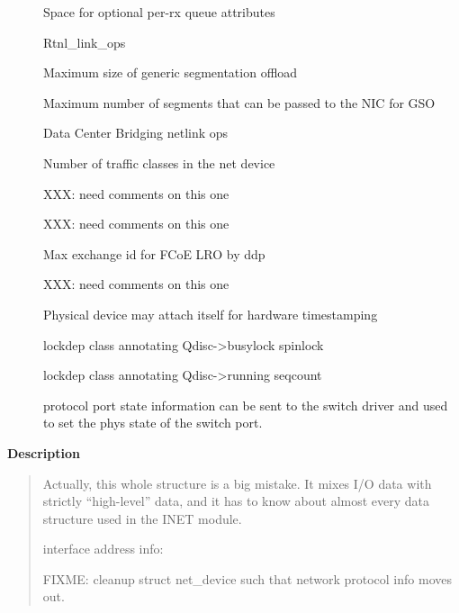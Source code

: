 \documentclass[a4paper,8pt,english]{sphinxmanual}
\begin{document}
\begin{description}
\item[{}] \leavevmode
Space for optional per-rx queue attributes

\item[{}] \leavevmode
Rtnl\_link\_ops

\item[{}] \leavevmode
Maximum size of generic segmentation offload

\item[{}] \leavevmode
Maximum number of segments that can be passed to the
NIC for GSO

\item[{}] \leavevmode
Data Center Bridging netlink ops

\item[{}] \leavevmode
Number of traffic classes in the net device

\item[{}] \leavevmode
XXX: need comments on this one

\item[{}] \leavevmode
XXX: need comments on this one

\item[{}] \leavevmode
Max exchange id for FCoE LRO by ddp

\item[{}] \leavevmode
XXX: need comments on this one

\item[{}] \leavevmode
Physical device may attach itself
for hardware timestamping

\item[{}] \leavevmode
lockdep class annotating Qdisc-\textgreater{}busylock spinlock

\item[{}] \leavevmode
lockdep class annotating Qdisc-\textgreater{}running seqcount

\item[{}] \leavevmode
protocol port state information can be sent to the
switch driver and used to set the phys state of the
switch port.

\end{description}

\textbf{Description}
\begin{quote}

Actually, this whole structure is a big mistake.  It mixes I/O
data with strictly ``high-level'' data, and it has to know about
almost every data structure used in the INET module.

interface address info:

FIXME: cleanup struct net\_device such that network protocol info
moves out.
\end{quote}
\end{document}
